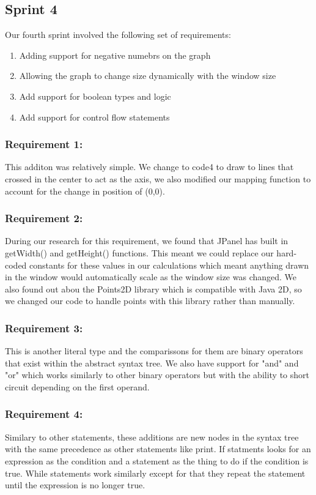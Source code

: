 \documentclass[a4paper, oneside, 11pt]{report}
\begin{document}
\subsection{Sprint 4}
Our fourth sprint involved the following set of requirements:
\begin{enumerate}
\item Adding support for negative numebrs on the graph
\item Allowing the graph to change size dynamically with the window size
\item Add support for boolean types and logic
\item Add support for control flow statements
\end{enumerate}

\subsubsection{Requirement 1: }
This additon was relatively simple. We change to code4 to draw to lines that crossed in the center to act as the axis, we also modified our mapping function to account for  the change in position of (0,0).
\subsubsection{Requirement 2: }
During our research for this requirement, we found that JPanel has built in getWidth() and getHeight() functions. This meant we could replace our hard-coded constants for these values in our calculations which meant anything drawn in the window would automatically scale as the window size was changed.
We also found out abou the Points2D library which is compatible with Java 2D, so we changed our code to handle points with this library rather than manually.
\subsubsection{Requirement 3: }
This is another literal type and the comparissons for them are binary operators that exist within the abstract syntax tree. We also have support for "and" and "or" which works similarly to other binary operators but with the ability to short circuit depending on the first operand.
\subsubsection{Requirement 4: }
Similary to other statements, these additions are new nodes in the syntax tree with the same precedence as other statements like print. If statments looks for an expression as the condition and a statement as the thing to do if the condition is true. While statements work similarly except for that they repeat the statement until the expression is no longer true.
\end{document}
